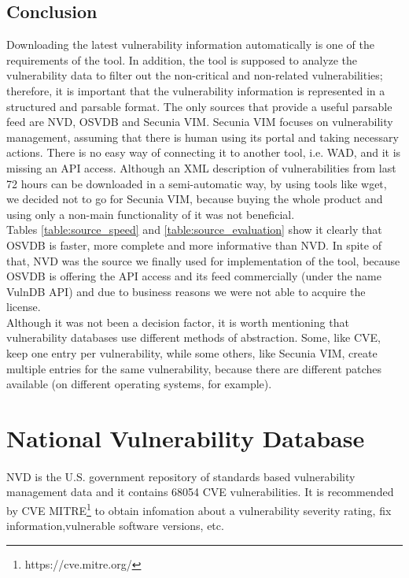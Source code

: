 \subsection{Conclusion}
Downloading the latest vulnerability information automatically is one of the requirements of the tool. In addition, the tool is supposed to analyze the vulnerability data to filter out the non-critical and non-related vulnerabilities; therefore, it is important that the vulnerability information is represented in a structured and parsable format. 
The only sources that provide a useful parsable feed are NVD, OSVDB and Secunia VIM. Secunia VIM focuses on vulnerability management, assuming that there is human using its portal and taking necessary actions. There is no easy way of connecting it to another tool, i.e. WAD, and it is missing an API access. Although an XML description of vulnerabilities from last 72 hours can be downloaded in a semi-automatic way, by using tools like wget, we decided not to go for Secunia VIM, because buying the whole product and using only a non-main functionality of it was not beneficial.
\\
Tables \ref{table:source_speed} and \ref{table:source_evaluation} show it clearly that OSVDB is faster, more complete and more informative than NVD. In spite of that, NVD was the source we finally used for implementation of the tool, because OSVDB is offering the API access and its feed commercially (under the name VulnDB API) and due to business reasons we were not able to acquire the license.
\\
Although it was not been a decision factor, it is worth mentioning that vulnerability databases use different methods of abstraction. Some, like CVE, keep one entry per vulnerability, while some others, like Secunia VIM, create multiple entries for the same vulnerability, because there are different patches available (on different operating systems, for example).

\section{National Vulnerability Database}
\paragraph{}
NVD is the U.S. government repository of standards based vulnerability management data and it contains 68054 CVE vulnerabilities. It is recommended by CVE MITRE\footnote{https://cve.mitre.org/} to obtain infomation about a vulnerability severity rating, fix information,vulnerable software versions, etc. 
 
